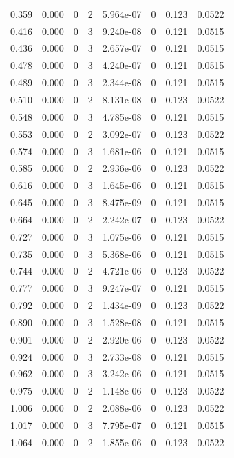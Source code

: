 \documentclass[preview]{standalone}
\begin{document}
{{\begin{tabular}{L{1.2cm}C{1.2cm} C{0.3cm}C{0.5cm} C{1.4cm}C{1.4cm} C{1.4cm}C{1.4cm}}
  0.359  &  0.000  & 0     &  2 &  5.964e-07  & 0  & 0.123 &  0.0522   \\ 
  0.416  &  0.000  & 0     &  3 &  9.240e-08  & 0  & 0.121 &  0.0515   \\ 
  0.436  &  0.000  & 0     &  3 &  2.657e-07  & 0  & 0.121 &  0.0515   \\ 
  0.478  &  0.000  & 0     &  3 &  4.240e-07  & 0  & 0.121 &  0.0515   \\ 
  0.489  &  0.000  & 0     &  3 &  2.344e-08  & 0  & 0.121 &  0.0515   \\ 
  0.510  &  0.000  & 0     &  2 &  8.131e-08  & 0  & 0.123 &  0.0522   \\ 
  0.548  &  0.000  & 0     &  3 &  4.785e-08  & 0  & 0.121 &  0.0515   \\ 
  0.553  &  0.000  & 0     &  2 &  3.092e-07  & 0  & 0.123 &  0.0522   \\ 
  0.574  &  0.000  & 0     &  3 &  1.681e-06  & 0  & 0.121 &  0.0515   \\ 
  0.585  &  0.000  & 0     &  2 &  2.936e-06  & 0  & 0.123 &  0.0522   \\ 
  0.616  &  0.000  & 0     &  3 &  1.645e-06  & 0  & 0.121 &  0.0515   \\ 
  0.645  &  0.000  & 0     &  3 &  8.475e-09  & 0  & 0.121 &  0.0515   \\ 
  0.664  &  0.000  & 0     &  2 &  2.242e-07  & 0  & 0.123 &  0.0522   \\ 
  0.727  &  0.000  & 0     &  3 &  1.075e-06  & 0  & 0.121 &  0.0515   \\ 
  0.735  &  0.000  & 0     &  3 &  5.368e-06  & 0  & 0.121 &  0.0515   \\ 
  0.744  &  0.000  & 0     &  2 &  4.721e-06  & 0  & 0.123 &  0.0522   \\ 
  0.777  &  0.000  & 0     &  3 &  9.247e-07  & 0  & 0.121 &  0.0515   \\ 
  0.792  &  0.000  & 0     &  2 &  1.434e-09  & 0  & 0.123 &  0.0522   \\ 
  0.890  &  0.000  & 0     &  3 &  1.528e-08  & 0  & 0.121 &  0.0515   \\ 
  0.901  &  0.000  & 0     &  2 &  2.920e-06  & 0  & 0.123 &  0.0522   \\ 
  0.924  &  0.000  & 0     &  3 &  2.733e-08  & 0  & 0.121 &  0.0515   \\ 
  0.962  &  0.000  & 0     &  3 &  3.242e-06  & 0  & 0.121 &  0.0515   \\ 
  0.975  &  0.000  & 0     &  2 &  1.148e-06  & 0  & 0.123 &  0.0522   \\ 
  1.006  &  0.000  & 0     &  2 &  2.088e-06  & 0  & 0.123 &  0.0522   \\ 
  1.017  &  0.000  & 0     &  3 &  7.795e-07  & 0  & 0.121 &  0.0515   \\ 
  1.064  &  0.000  & 0     &  2 &  1.855e-06  & 0  & 0.123 &  0.0522   \\ 
\hline 
\end{tabular} 

}}
\end{document}
